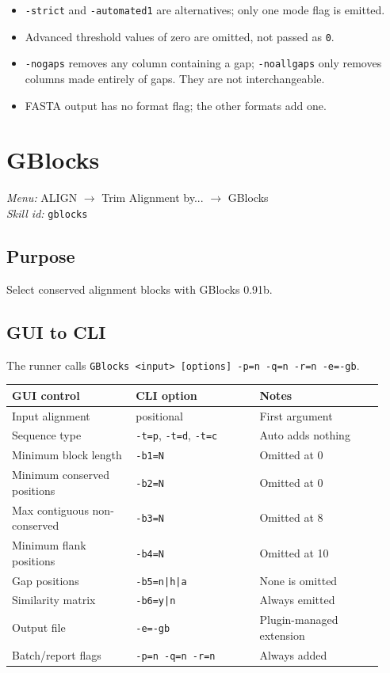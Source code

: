 \documentclass[11pt]{report}
\begin{document}
\begin{itemize}
  \item \texttt{-strict} and \texttt{-automated1} are alternatives; only one mode flag is emitted.
  \item Advanced threshold values of zero are omitted, not passed as \texttt{0}.
  \item \texttt{-nogaps} removes any column containing a gap; \texttt{-noallgaps} only removes columns made entirely of gaps. They are not interchangeable.
  \item FASTA output has no format flag; the other formats add one.
\end{itemize}


\section{GBlocks}
\noindent\textit{Menu:} ALIGN $\rightarrow$ Trim Alignment by... $\rightarrow$ GBlocks\\
\noindent\textit{Skill id:} \texttt{gblocks}

\subsection{Purpose}

Select conserved alignment blocks with GBlocks 0.91b.

\subsection{GUI to CLI}

The runner calls \texttt{GBlocks <input> [options] -p=n -q=n -r=n -e=-gb}.

{\footnotesize
\begin{longtable}{@{}>{\raggedright\arraybackslash}p{0.31\linewidth}>{\raggedright\arraybackslash}p{0.31\linewidth}>{\raggedright\arraybackslash}p{0.31\linewidth}@{}}
\toprule
GUI control & CLI option & Notes \\
\midrule
\endhead
Input alignment & positional & First argument \\
Sequence type & \texttt{-t=p}, \texttt{-t=d}, \texttt{-t=c} & Auto adds nothing \\
Minimum block length & \texttt{-b1=N} & Omitted at 0 \\
Minimum conserved positions & \texttt{-b2=N} & Omitted at 0 \\
Max contiguous non-conserved & \texttt{-b3=N} & Omitted at 8 \\
Minimum flank positions & \texttt{-b4=N} & Omitted at 10 \\
Gap positions & \texttt{-b5=n|\allowbreak h|\allowbreak a} & None is omitted \\
Similarity matrix & \texttt{-b6=y|\allowbreak n} & Always emitted \\
Output file & \texttt{-e=-gb} & Plugin-managed extension \\
Batch/report flags & \texttt{-p=n -q=n -r=n} & Always added \\
\bottomrule
\end{longtable}
}
\end{document}
